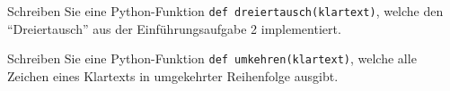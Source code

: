  \begin{myexercise}
 Schreiben Sie eine Python-Funktion \lstinline|def dreiertausch(klartext)|, welche den \enquote{Dreiertausch} aus der Einführungsaufgabe 2 implementiert.
 \begin{myanswer}

 \end{myanswer}
 \end{myexercise}
 
  \begin{myexercise}
  Schreiben Sie eine Python-Funktion \lstinline|def umkehren(klartext)|, welche alle Zeichen eines Klartexts in umgekehrter Reihenfolge ausgibt.
  \begin{myanswer}

  \end{myanswer}
  \end{myexercise}
  
 \newpage
 
